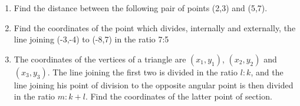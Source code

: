 \renewcommand{\theequation}{\theenumi}
\renewcommand{\thefigure}{\theenumi}
\begin{enumerate}[label=\thesubsection.\arabic*.,ref=\thesubsection.\theenumi]

\item Find the distance between the following pair of points (2,3) and (5,7). 
\\
\solution


\item Find the coordinates of the point which divides, internally and externally, the line joining (-3,-4) to (-8,7) in the ratio 7:5
\\
\solution
 

\item The coordinates of the vertices of a triangle are $(x_1,y_1)$, $(x_2,y_2)$ and $(x_3,y_3)$. The line joining the first two is divided in the ratio $l:k$, and the line joining his point of division to the opposite angular point is then divided in the ratio  $m:k+l$. Find the coordinates of the latter point of section. 
%
\\
\solution


\end{enumerate}
